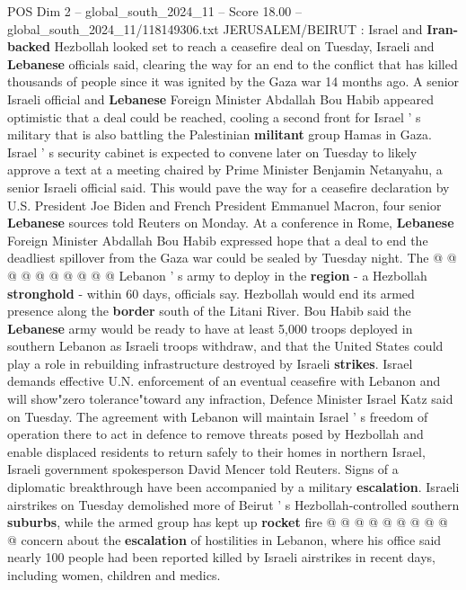 \begin{textsample}{POS Dim 2 – global\_south\_2024\_11 – Score 18.00 – global\_south\_2024\_11/118149306.txt}  \label{ex:f2_pos_180}
JERUSALEM/BEIRUT : Israel and \textbf{Iran-backed} Hezbollah looked set to reach a ceasefire deal on Tuesday, Israeli and \textbf{Lebanese} officials said, clearing the way for an end to the conflict that has killed thousands of people since it was ignited by the Gaza war 14 months ago.
A senior Israeli official and \textbf{Lebanese} Foreign Minister Abdallah Bou Habib appeared optimistic that a deal could be reached, cooling a second front for Israel ' s military that is also battling the Palestinian \textbf{militant} group Hamas in Gaza.
Israel ' s security cabinet is expected to convene later on Tuesday to likely approve a text at a meeting chaired by Prime Minister Benjamin Netanyahu, a senior Israeli official said.
This would pave the way for a ceasefire declaration by U.S.
President Joe Biden and French President Emmanuel Macron, four senior \textbf{Lebanese} sources told Reuters on Monday.
At a conference in Rome, \textbf{Lebanese} Foreign Minister Abdallah Bou Habib expressed hope that a deal to end the deadliest spillover from the Gaza war could be sealed by Tuesday night.
The @ @ @ @ @ @ @ @ @ @ Lebanon ' s army to deploy in the \textbf{region} - a Hezbollah \textbf{stronghold} - within 60 days, officials say.
Hezbollah would end its armed presence along the \textbf{border} south of the Litani River.
Bou Habib said the \textbf{Lebanese} army would be ready to have at least 5,000 troops deployed in southern Lebanon as Israeli troops withdraw, and that the United States could play a role in rebuilding infrastructure destroyed by Israeli \textbf{strikes}.
Israel demands effective U.N. enforcement of an eventual ceasefire with Lebanon and will show"zero tolerance"toward any infraction, Defence Minister Israel Katz said on Tuesday.
The agreement with Lebanon will maintain Israel ' s freedom of operation there to act in defence to remove threats posed by Hezbollah and enable displaced residents to return safely to their homes in northern Israel, Israeli government spokesperson David Mencer told Reuters.
Signs of a diplomatic breakthrough have been accompanied by a military \textbf{escalation}.
Israeli airstrikes on Tuesday demolished more of Beirut ' s Hezbollah-controlled southern \textbf{suburbs}, while the armed group has kept up \textbf{rocket} fire @ @ @ @ @ @ @ @ @ @ concern about the \textbf{escalation} of hostilities in Lebanon, where his office said nearly 100 people had been reported killed by Israeli airstrikes in recent days, including women, children and medics.

\end{textsample}
